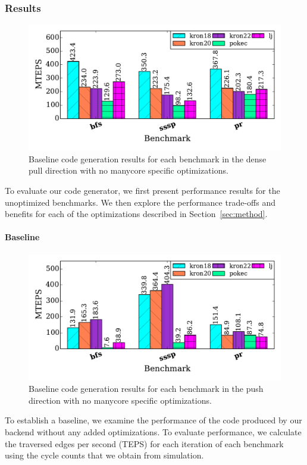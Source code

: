 \subsubsection{Results}
\begin{figure}[t]
    \centering
    \includegraphics[scale = 0.5]{graphit-figures/baseline.pdf}
    \caption{Baseline code generation results for each benchmark in the dense pull direction with no manycore specific optimizations.}
    \label{pap:generals:sec:eval:fig:baseline}
\end{figure}

To evaluate our code generator, we first present performance results for the unoptimized benchmarks. 
We then explore the performance trade-offs and benefits for each of the optimizations described in Section~\ref{sec:method}.

\paragraph{Baseline}
 
\begin{figure}[t]
    \centering
    \includegraphics[scale = 0.5]{graphit-figures/push.pdf}
    \caption{Baseline code generation results for each benchmark in the push direction with no manycore specific optimizations.}
    \label{pap:generals:sec:eval:fig:push}
\end{figure}
To establish a baseline, we examine the performance of the code produced by our backend without any added optimizations.
To evaluate performance, we calculate the traversed edges per second (TEPS) for each iteration of each benchmark using the cycle counts that we obtain from simulation.

